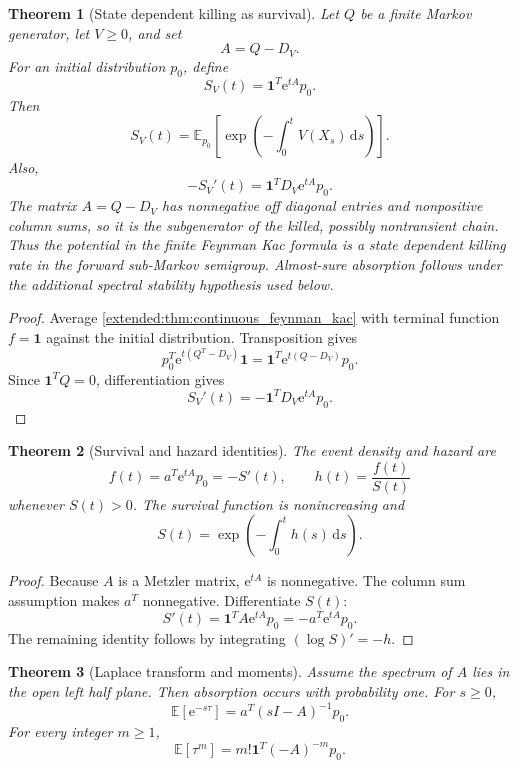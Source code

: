 \documentclass[11pt,a4paper]{article}
\newtheorem{theorem}{Theorem}[section]
\theoremstyle{definition}
\theoremstyle{remark}
\newcommand{\Exp}{\mathbb E}
\newcommand{\e}{\mathrm e}
\newcommand{\one}{\bm 1}
\newcommand{\dd}{\,\mathrm d}
\begin{document}
\begin{theorem}[State dependent killing as survival]\label{extended:record:097}\label{extended:thm:killing_survival}
Let \(Q\) be a finite Markov generator, let \(V\geq0\), and set
\[
A=Q-D_V.
\]
For an initial distribution \(p_0\), define
\[
S_V(t)=\one^T\e^{tA}p_0.
\]
Then
\[
S_V(t)
=
\Exp_{p_0}
\left[
\exp\left(
-\int_0^tV(X_s)\dd s
\right)
\right].
\]
Also,
\[
-S_V'(t)
=
\one^TD_V\e^{tA}p_0.
\]
The matrix \(A=Q-D_V\) has nonnegative off diagonal entries and nonpositive column sums, so it is the subgenerator of the killed, possibly nontransient chain. Thus the potential in the finite Feynman Kac formula is a state dependent killing rate in the forward sub-Markov semigroup. Almost-sure absorption follows under the additional spectral stability hypothesis used below.
\end{theorem}

\begin{proof}
Average \cref{extended:thm:continuous_feynman_kac} with terminal function \(f=\one\) against the initial distribution. Transposition gives
\[
p_0^T\e^{t(Q^T-D_V)}\one
=
\one^T\e^{t(Q-D_V)}p_0.
\]
Since \(\one^TQ=0\), differentiation gives
\[
S_V'(t)
=
-\one^TD_V\e^{tA}p_0.
\]
\end{proof}

\begin{theorem}[Survival and hazard identities]\label{extended:record:098}\label{extended:thm:survival_hazard}
The event density and hazard are
\[
f(t)=a^T\e^{tA}p_0=-S'(t),
\qquad
h(t)=\frac{f(t)}{S(t)}
\]
whenever \(S(t)>0\). The survival function is nonincreasing and
\[
S(t)
=
\exp\left(
-\int_0^th(s)\dd s
\right).
\]
\end{theorem}

\begin{proof}
Because \(A\) is a Metzler matrix, \(\e^{tA}\) is nonnegative. The column sum assumption makes \(a^T\) nonnegative. Differentiate \(S(t)\):
\[
S'(t)=\one^TA\e^{tA}p_0=-a^T\e^{tA}p_0.
\]
The remaining identity follows by integrating \((\log S)'=-h\).
\end{proof}

\begin{theorem}[Laplace transform and moments]\label{extended:record:099}\label{extended:thm:survival_moments}
Assume the spectrum of \(A\) lies in the open left half plane. Then absorption occurs with probability one. For \(s\geq0\),
\[
\Exp[\e^{-s\tau}]
=
a^T(sI-A)^{-1}p_0.
\] For every integer \(m\geq1\),
\[
\Exp[\tau^m]
=
m!\one^T(-A)^{-m}p_0.
\]
\end{theorem}
\end{document}

